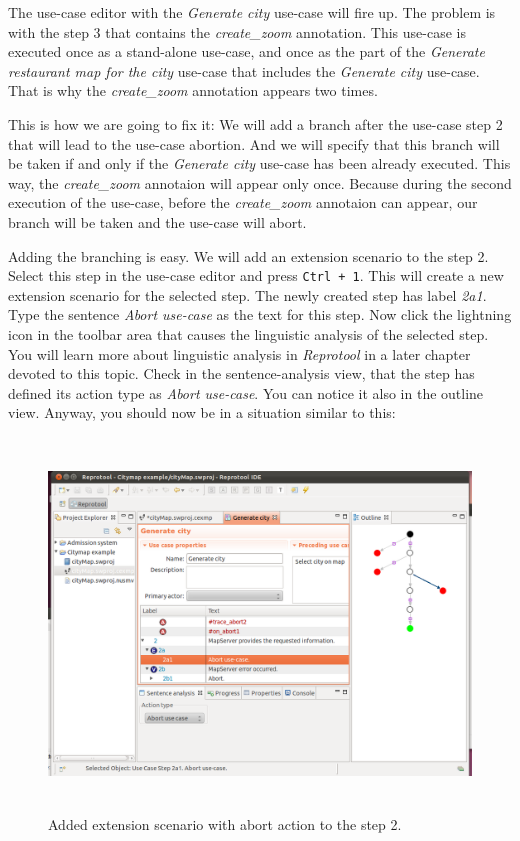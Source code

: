 The use-case editor with the \emph{Generate city} use-case will fire up. The problem is with the step 3 that contains the \emph{create\_zoom}
annotation. This use-case is executed once as a stand-alone use-case, and once as the part of the \emph{Generate restaurant map for
the city} use-case that includes the \emph{Generate city} use-case. That is why the \emph{create\_zoom} annotation appears two times.

This is how we are going to fix it: We will add a branch after the use-case step 2 that will lead to the use-case abortion. And we will
specify that this branch will be taken if and only if the \emph{Generate city} use-case has been already executed. This way,
the \emph{create\_zoom} annotaion will appear only once. Because during the second execution of the use-case, before the
\emph{create\_zoom} annotaion can appear, our branch will be taken and the use-case will abort.

Adding the branching is easy. We will add an extension scenario to the step 2. Select this step in the use-case editor and press
\texttt{Ctrl + 1}. This will create a new extension scenario for the selected step. The newly created step has label \emph{2a1}.
Type the sentence \emph{Abort use-case} as the text for this step. Now click the lightning icon in the toolbar area that causes
the linguistic analysis of the selected step. You will learn more about linguistic analysis in \emph{Reprotool} in a later chapter
devoted to this topic. Check in the sentence-analysis view, that the step has defined its action type as \emph{Abort use-case}.
You can notice it also in the outline view. Anyway, you should now be in a situation similar to this:

\begin{figure}[ht]
  \centering
  \includegraphics[height=280pt]{images/reprotoolTraceCityMapFix1}
  \caption{Added extension scenario with abort action to the step 2.}
  \label{fig:reprotoolTraceCityMapFix1}
\end{figure}

